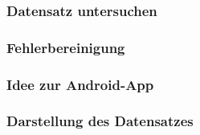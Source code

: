 \begin{frame}
    \frametitle{Datensatz untersuchen}
\end{frame}

\begin{frame}
    \frametitle{Fehlerbereinigung}
\end{frame}

\begin{frame}
    \frametitle{Idee zur Android-App}
\end{frame}

\begin{frame}
    \frametitle{Darstellung des Datensatzes}
\end{frame}
